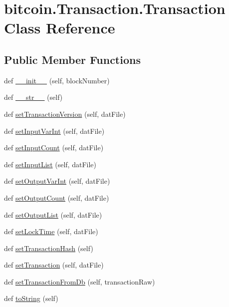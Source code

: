 \hypertarget{classbitcoin_1_1Transaction_1_1Transaction}{}\section{bitcoin.\+Transaction.\+Transaction Class Reference}
\label{classbitcoin_1_1Transaction_1_1Transaction}
\subsection*{Public Member Functions}
\begin{DoxyCompactItemize}
\item 
def \hyperlink{classbitcoin_1_1Transaction_1_1Transaction_a4318465823cd8b11f9afb3d9c22f5b08}{\+\_\+\+\_\+init\+\_\+\+\_\+} (self, block\+Number)
\item 
def \hyperlink{classbitcoin_1_1Transaction_1_1Transaction_a6678e7dc0b185589e8730daa149a6326}{\+\_\+\+\_\+str\+\_\+\+\_\+} (self)
\item 
def \hyperlink{classbitcoin_1_1Transaction_1_1Transaction_a67d466a525482a6666895dfeb6efda85}{set\+Transaction\+Version} (self, dat\+File)
\item 
def \hyperlink{classbitcoin_1_1Transaction_1_1Transaction_a621a321873185264b1c0bbd0d5af3566}{set\+Input\+Var\+Int} (self, dat\+File)
\item 
def \hyperlink{classbitcoin_1_1Transaction_1_1Transaction_ae7bbda9c1da551c1d5528a2651f9389c}{set\+Input\+Count} (self, dat\+File)
\item 
def \hyperlink{classbitcoin_1_1Transaction_1_1Transaction_a2abfd1f820945d730afac46f40179e3f}{set\+Input\+List} (self, dat\+File)
\item 
def \hyperlink{classbitcoin_1_1Transaction_1_1Transaction_a8b655569ded4b474d14763a485a5bf2c}{set\+Output\+Var\+Int} (self, dat\+File)
\item 
def \hyperlink{classbitcoin_1_1Transaction_1_1Transaction_a397510151f9171950fd742a79e4f7767}{set\+Output\+Count} (self, dat\+File)
\item 
def \hyperlink{classbitcoin_1_1Transaction_1_1Transaction_a1b966edd3df92fe84e41232f3ce3b625}{set\+Output\+List} (self, dat\+File)
\item 
def \hyperlink{classbitcoin_1_1Transaction_1_1Transaction_aedc9003f056865738133a3cc8cd115ff}{set\+Lock\+Time} (self, dat\+File)
\item 
def \hyperlink{classbitcoin_1_1Transaction_1_1Transaction_a767ceacfa973aa342068002f5fa12396}{set\+Transaction\+Hash} (self)
\item 
def \hyperlink{classbitcoin_1_1Transaction_1_1Transaction_ae52f587930049f71bc39d5d92beb2798}{set\+Transaction} (self, dat\+File)
\item 
def \hyperlink{classbitcoin_1_1Transaction_1_1Transaction_a1dd2986e931202bebd3ee6cd5e57c1c3}{set\+Transaction\+From\+Db} (self, transaction\+Raw)
\item 
def \hyperlink{classbitcoin_1_1Transaction_1_1Transaction_a40d319384cbd5871e01ebd0edd02c1e6}{to\+String} (self)
\end{DoxyCompactItemize}
